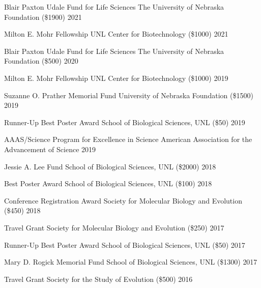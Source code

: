 
\begin{cvhonors}

  \cvhonor
    {Blair Paxton Udale Fund for Life Sciences}
    {The University of Nebraska Foundation (\$1900)}
    {2021}

  \cvhonor
    {Milton E. Mohr Fellowship}
    {UNL Center for Biotechnology (\$1000)}
    {2021}

  \cvhonor
    {Blair Paxton Udale Fund for Life Sciences}
    {The University of Nebraska Foundation (\$500)}
    {2020}

  \cvhonor
    {Milton E. Mohr Fellowship}
    {UNL Center for Biotechnology (\$1000)}
    {2019}

  \cvhonor
    {Suzanne O. Prather Memorial Fund}
    {University of Nebraska Foundation (\$1500)}
    {2019}

  \cvhonor
    {Runner-Up Best Poster Award}
    {School of Biological Sciences, UNL (\$50)}
    {2019}

  \cvhonor
    {AAAS/Science Program for Excellence in Science}
    {American Association for the Advancement of Science}
    {2019}

  \cvhonor
    {Jessie A. Lee Fund} 
    {School of Biological Sciences, UNL (\$2000)}
    {2018} %

  \cvhonor
    {Best Poster Award}
    {School of Biological Sciences, UNL (\$100)}
    {2018}

  \cvhonor
    {Conference Registration Award}
    {Society for Molecular Biology and Evolution (\$450)}
    {2018}

  \cvhonor
    {Travel Grant}
    {Society for Molecular Biology and Evolution (\$250)}
    {2017}

  \cvhonor
    {Runner-Up Best Poster Award}
    {School of Biological Sciences, UNL (\$50)}
    {2017}

  \cvhonor
    {Mary D. Rogick Memorial Fund}
    {School of Biological Sciences, UNL (\$1300)}
    {2017}

  \cvhonor
    {Travel Grant}
    {Society for the Study of Evolution (\$500)}
    {2016}


\end{cvhonors}

